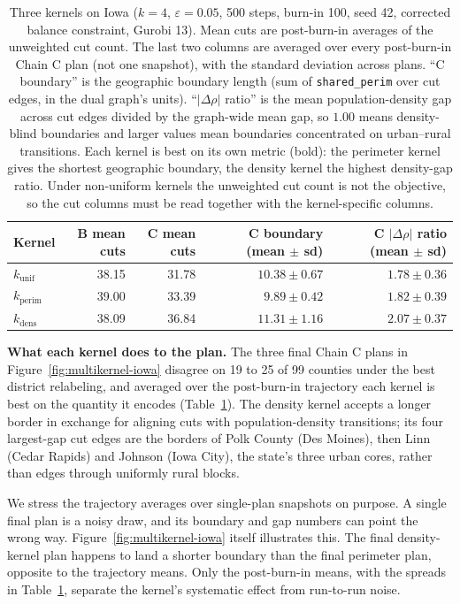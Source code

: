 \documentclass[11pt]{article}
\begin{document}
\begin{table}[htbp]
\centering
\small
\begin{tabular}{lrrrr}
\toprule
Kernel & B mean cuts & C mean cuts & C boundary (mean $\pm$ sd)
  & C $|\Delta\rho|$ ratio (mean $\pm$ sd) \\
\midrule
$k_{\mathrm{unif}}$  & 38.15 & 31.78 & $10.38 \pm 0.67$ & $1.78 \pm 0.36$ \\
$k_{\mathrm{perim}}$ & 39.00 & 33.39 & $\mathbf{9.89 \pm 0.42}$ & $1.82 \pm 0.39$ \\
$k_{\mathrm{dens}}$  & 38.09 & 36.84 & $11.31 \pm 1.16$ & $\mathbf{2.07 \pm 0.37}$ \\
\bottomrule
\end{tabular}
\caption{Three kernels on Iowa ($k = 4$, $\varepsilon = 0.05$,
  500 steps, burn-in 100, seed 42, corrected balance constraint,
  Gurobi 13). Mean cuts are post-burn-in averages of the unweighted
  cut count. The last two columns are averaged over every post-burn-in
  Chain C plan (not one snapshot), with the standard deviation across
  plans. ``C boundary'' is the geographic boundary length (sum of
  \texttt{shared\_perim} over cut edges, in the dual graph's units).
  ``$|\Delta\rho|$ ratio'' is the mean population-density gap across
  cut edges divided by the graph-wide mean gap, so $1.00$ means
  density-blind boundaries and larger values mean boundaries
  concentrated on urban--rural transitions. Each kernel is best on its
  own metric (bold): the perimeter kernel gives the shortest
  geographic boundary, the density kernel the highest density-gap
  ratio. Under non-uniform kernels the unweighted cut count is not the
  objective, so the cut columns must be read together with the
  kernel-specific columns.}\label{tab:multikernel-iowa}
\end{table}

\textbf{What each kernel does to the plan.} The three final Chain C
plans in Figure~\ref{fig:multikernel-iowa} disagree on 19 to 25 of 99
counties under the best district relabeling, and averaged over the
post-burn-in trajectory each kernel is best on the quantity it
encodes (Table~\ref{tab:multikernel-iowa}). The density kernel
accepts a longer border in exchange for aligning cuts with
population-density transitions; its four largest-gap cut edges are
the borders of Polk County (Des Moines), then Linn (Cedar Rapids) and
Johnson (Iowa City), the state's three urban cores, rather than edges
through uniformly rural blocks.

We stress the trajectory averages over single-plan snapshots on
purpose. A single final plan is a noisy draw, and its boundary and
gap numbers can point the wrong way. Figure~\ref{fig:multikernel-iowa}
itself illustrates this. The final density-kernel plan happens to land
a shorter boundary than the final perimeter plan, opposite to the
trajectory means. Only the post-burn-in means, with the
spreads in Table~\ref{tab:multikernel-iowa}, separate the kernel's
systematic effect from run-to-run noise.
\end{document}
